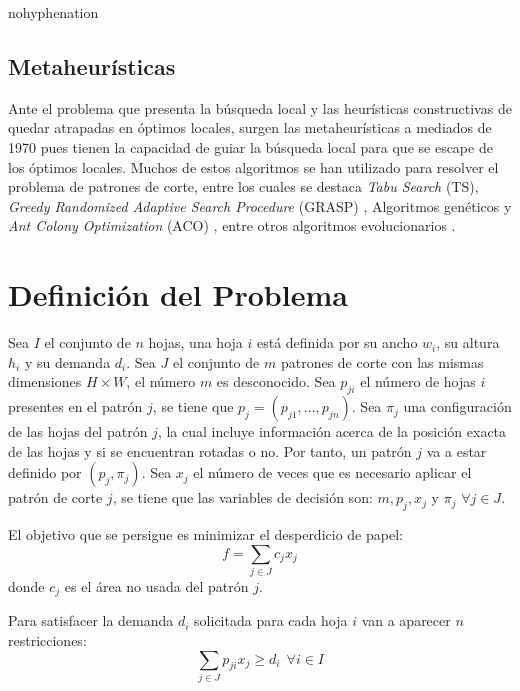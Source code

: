 \documentclass[a4paper,10pt,twocolumn]{article}
\begin{document}
\begin{hyphenrules}{nohyphenation}
\subsection{ Metaheurísticas }
Ante el problema que presenta la búsqueda local y
las heurísticas constructivas de quedar atrapadas en
óptimos locales, surgen las metaheurísticas a mediados
de 1970 pues tienen la capacidad de guiar la búsqueda
local para que se escape de los óptimos locales. Muchos
de estos algoritmos se han utilizado para resolver
el problema de patrones de corte, entre los cuales
se destaca \textit{Tabu Search} (TS), \textit{Greedy Randomized
Adaptive Search Procedure} (GRASP) \cite{42}, Algoritmos
genéticos \cite{43,46} y \textit{Ant Colony Optimization} (ACO) \cite{47,48}, entre otros algoritmos evolucionarios \cite{51}.

\section{Definición del Problema}\label{def}
Sea $I$ el conjunto de $n$ hojas, una hoja $i$ está definida por su ancho $w_i$, su altura $h_i$ y su demanda $d_i$. Sea $J$ el conjunto de $m$ patrones de corte con las mismas dimensiones $H \times W$, el número $m$ es desconocido. Sea $p_{ji}$ el número de hojas $i$ presentes en el patrón $j$, se tiene que $p_j = (p_{j1},...,p_{jn})$. Sea $\pi_j$ una configuración de las hojas del patrón $j$, la cual incluye información acerca de la posición exacta de las hojas y si se encuentran rotadas o no. Por tanto, un patrón $j$ va a estar definido por $(p_j,\pi_j)$. Sea $x_j$ el número de veces que es necesario aplicar el patrón de corte $j$, se tiene que las variables de decisión son: $m, p_j, x_j$ y $\pi_j$ $\forall j \in J$.  

El objetivo que se persigue es minimizar el desperdicio de papel:
\begin{equation}
f = \sum_{j \in J}c_j x_j
\label{eq1}
\end{equation}
donde $c_j$ es el área no usada del patrón $j$.

Para satisfacer la demanda $d_i$ solicitada para cada hoja $i$ van a aparecer $n$ restricciones:
\begin{equation}
\sum_{j \in J}p_{ji}x_j \geq  d_i \ \  \forall i \in I
\label{eq2}
\end{equation}


\end{hyphenrules}
\end{document}
